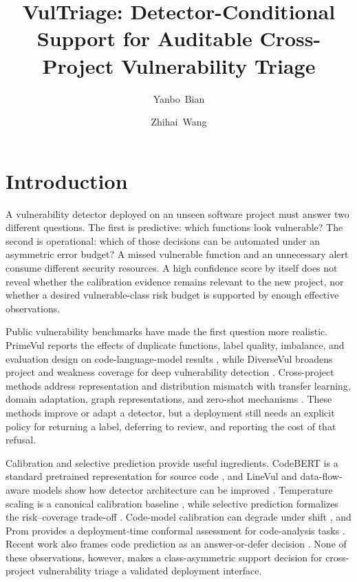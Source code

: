 \documentclass[research]{fcs}
\title{VulTriage: Detector-Conditional Support for Auditable Cross-Project Vulnerability Triage}
\author[1,+]{Yanbo~Bian}
\author[2,+]{Zhihai~Wang}
\begin{document}
\section{Introduction}

A vulnerability detector deployed on an unseen software project must answer two different questions. The first is predictive: which functions look vulnerable? The second is operational: which of those decisions can be automated under an asymmetric error budget? A missed vulnerable function and an unnecessary alert consume different security resources. A high confidence score by itself does not reveal whether the calibration evidence remains relevant to the new project, nor whether a desired vulnerable-class risk budget is supported by enough effective observations.

Public vulnerability benchmarks have made the first question more realistic. PrimeVul reports the effects of duplicate functions, label quality, imbalance, and evaluation design on code-language-model results \cite{ding2025primevul}, while DiverseVul broadens project and weakness coverage for deep vulnerability detection \cite{chen2023diversevul}. Cross-project methods address representation and distribution mismatch with transfer learning, domain adaptation, graph representations, and zero-shot mechanisms \cite{lin2018transfer,liu2022cdvuld,zhang2023cpvd,nguyen2024dam2p,cai2024csvdtf,haque2026zsvuld}. These methods improve or adapt a detector, but a deployment still needs an explicit policy for returning a label, deferring to review, and reporting the cost of that refusal.

Calibration and selective prediction provide useful ingredients. CodeBERT is a standard pretrained representation for source code \cite{feng2020codebert}, and LineVul and data-flow-aware models show how detector architecture can be improved \cite{fu2022linevul,steenhoek2024deepdfa}. Temperature scaling is a canonical calibration baseline \cite{guo2017calibration}, while selective prediction formalizes the risk--coverage trade-off \cite{geifman2019selectivenet}. Code-model calibration can degrade under shift \cite{zhou2024calibration}, and Prom provides a deployment-time conformal assessment for code-analysis tasks \cite{wang2025prom}. Recent work also frames code prediction as an answer-or-defer decision \cite{rathnasuriya2026defer}. None of these observations, however, makes a class-asymmetric support decision for cross-project vulnerability triage a validated deployment interface.
\end{document}
